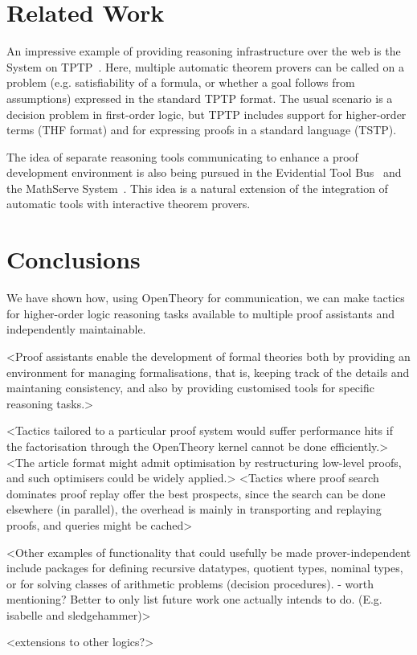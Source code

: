 \documentclass{llncs}
\newcommand{\OpenTheory}{OpenTheory\xspace}
\newcommand{\eg}{e.g.\xspace}
\begin{document}


\section{Related Work}

An impressive example of providing reasoning infrastructure over the web is the System on TPTP~\cite{DBLP:conf/lpar/Sutcliffe10}.
Here, multiple automatic theorem provers can be called on a problem (\eg satisfiability of a formula, or whether a goal follows from assumptions) expressed in the standard TPTP format.
The usual scenario is a decision problem in first-order logic, but TPTP includes support for higher-order terms (THF format) and for expressing proofs in a standard language (TSTP).

The idea of separate reasoning tools communicating to enhance a proof development environment is also being pursued in the Evidential Tool Bus~\cite{DBLP:conf/icfem/Rushby05,fk:etb} and the MathServe System~\cite{DBLP:conf/cade/ZimmerA06}.
This idea is a natural extension of the integration of automatic tools with interactive theorem provers.

\section{Conclusions}

We have shown how, using \OpenTheory for communication, we can make tactics for higher-order logic reasoning tasks available to multiple proof assistants and independently maintainable.

<Proof assistants enable the development of formal theories both by providing an environment for managing formalisations, that is, keeping track of the details and maintaning consistency, and also by providing customised tools for specific reasoning tasks.>

<Tactics tailored to a particular proof system would suffer performance hits if the factorisation through the OpenTheory kernel cannot be done efficiently.>
<The article format might admit optimisation by restructuring low-level proofs, and such optimisers could be widely applied.>
<Tactics where proof search dominates proof replay offer the best prospects, since the search can be done elsewhere (in parallel), the overhead is mainly in transporting and replaying proofs, and queries might be cached>

<Other examples of functionality that could usefully be made prover-independent include packages for defining recursive datatypes, quotient types, nominal types, or for solving classes of arithmetic problems (decision procedures). - worth mentioning? Better to only list future work one actually intends to do. (E.g. isabelle and sledgehammer)>

<extensions to other logics?>



\end{document}
